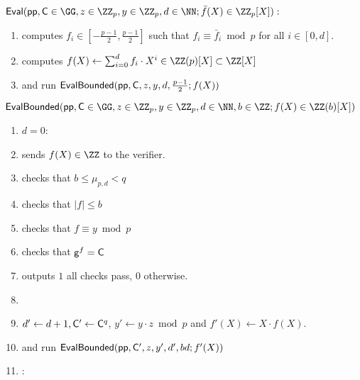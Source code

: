 \begin{small}
\begin{mdframed}
\begin{minipage}{\textwidth}
			$\pro{Eval}(\crs, \gr{C}\in \GG, z\in \ZZ_p, y\in \ZZ_p, d \in \NN; \bar{f}(X)\in \ZZ_p[X]) :$ 
			\begin{enumerate}[nolistsep]
			\item \prover computes $f_i \in [-\frac{p-1}{2},\frac{p-1}{2}]$ such that $f_i\equiv \bar{f}_i\bmod p$ for all $i\in[0,d]$.
			\item \prover computes $f(X)\gets \sum_{i=0}^d f_i \cdot X^{i}\in \ZZ(p)[X]\subset \ZZ[X]$
			\item \prover and \verifier run $\textsf{{EvalBounded}}(\textsf{pp},\mathsf{C},z,y,d,\frac{p-1}{2};f(X))$
		    \end{enumerate}
		    		\vspace{1em}
		$\pro{EvalBounded}(\crs,\gr{C}\in \GG,z\in \ZZ_p,y\in \ZZ_p,d\in \NN,b\in \ZZ;f(X)\in \ZZ(b)[X])$		
	    \begin{enumerate}[nolistsep]
        \item \pcif $d=0$:
        \item \label{line:basestart}\pcind[1] \prover sends $f(X)\in \ZZ$ to the verifier. 
        \item \pcind[1] \verifier checks that $b\leq \mu_{p,d} < q$
        \item \pcind[1] \verifier checks that $|f|\leq b$
          \item \pcind[1] \verifier checks that $f\equiv y \bmod p$
                \item \label{line:baseend}\pcind[1] \verifier checks that $\mathsf{g}^{f}=\mathsf{C}$
\item \pcind[1] \verifier outputs $1$ \pcif all checks pass, $0$ otherwise.
          \item {}
         \item \pcind[1]  $d'\gets d+1, \mathsf{C}'\gets \mathsf{C}^q$, $y'\gets y\cdot z \bmod p$ and $f'(X)\gets X \cdot f(X)$.
         \item \pcind[1] \prover and \verifier run $\textsf{{EvalBounded}}(\textsf{pp},\mathsf{C}',z,y',d',bd;f'(X))$

        \item \pcelse: 
       

\end{enumerate}
\end{minipage}
\end{mdframed}
\end{small}
